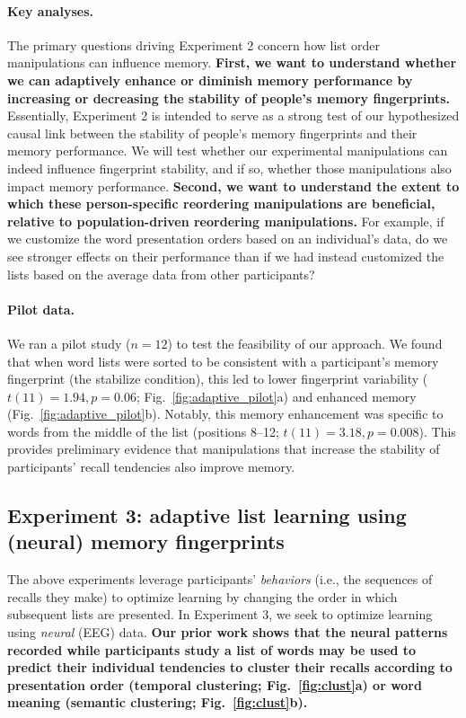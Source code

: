 \paragraph{Key analyses.}  The primary questions driving Experiment 2 concern how list order manipulations can influence memory.  \textbf{First, we want to understand whether we can adaptively enhance or diminish memory performance by increasing or decreasing the stability of people's memory fingerprints.}  Essentially, Experiment 2 is intended to serve as a strong test of our hypothesized causal link between the stability of people's memory fingerprints and their memory performance.  We will test whether our experimental manipulations can indeed influence fingerprint stability, and if so, whether those manipulations also impact memory performance.  \textbf{Second, we want to understand the extent to which these person-specific reordering manipulations are beneficial, relative to population-driven reordering manipulations.}  For example, if we customize the word presentation orders based on an individual's data, do we see stronger effects on their performance than if we had instead customized the lists based on the average data from other participants?

\paragraph{Pilot data.}  We ran a pilot study ($n = 12$) to test the feasibility of our approach.  We found that when word lists were sorted to be consistent with a participant's memory fingerprint (the stabilize condition), this led to lower fingerprint variability ($t(11) = 1.94, p = 0.06$; Fig.~\ref{fig:adaptive_pilot}a) and enhanced memory (Fig.~\ref{fig:adaptive_pilot}b).  Notably, this memory enhancement was specific to words from the middle of the list (positions 8--12; $t(11)=3.18, p=0.008$). This provides preliminary evidence that manipulations that increase the stability of participants' recall tendencies also improve memory.



\subsection*{Experiment 3: adaptive list learning using (neural) memory fingerprints}

The above experiments leverage participants' \textit{behaviors} (i.e., the
sequences of recalls they make) to optimize learning by changing the order in
which subsequent lists are presented. In Experiment 3, we seek to optimize
learning using \textit{neural} (EEG) data. \textbf{Our prior work shows that
the neural patterns recorded while participants study a list of words may be
used to predict their individual tendencies to cluster their recalls according
to presentation order (temporal clustering; Fig.~\ref{fig:clust}a) or word
meaning (semantic clustering; Fig.~\ref{fig:clust}b).}



